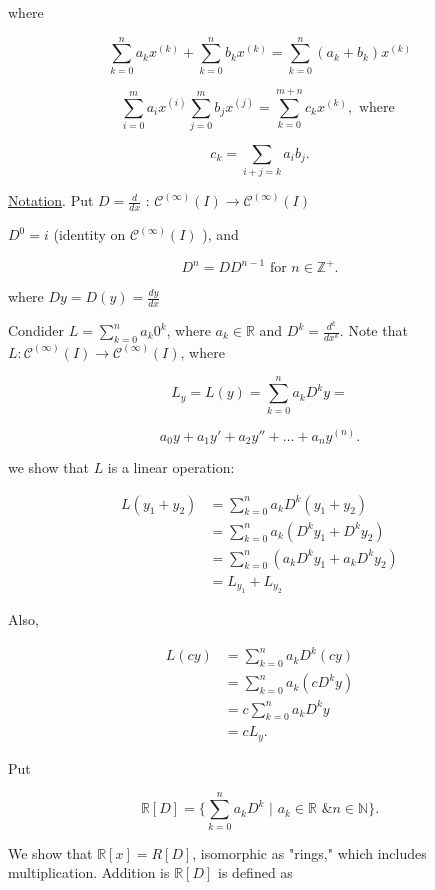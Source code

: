 \documentclass{article}
\theoremstyle{definition}
\begin{document}
where

\[ \sum_{k=0}^n a_kx^{(k)} + \sum_{k=0}^n b_kx^{(k)} = \sum_{k=0}^n
(a_k + b_k)x^{(k)}   \]

\[ \sum_{i=0}^m a_ix^{(i)} \sum_{j=0}^m b_jx^{(j)}  = \sum_{k=0}^{m+n}
c_k x^{(k)}, \text{ where }\]

\[ c_k = \sum_{i+j=k} a_ib_j .\]

\underline{Notation}. Put \( D = \frac{d}{dx} \text{ : }
\mathscr{C}^{(\infty)} (I) \to \mathscr{C}^{(\infty)} (I) \) 

\( D^0 = i \) (identity on \(\mathscr{C}^{(\infty)} (I) \) ), and 

\[ D^n = D D^{n-1} \text{ for } n \in \mathbb{Z}^+ .\]

\hrulefill

where \( Dy = D(y) = \frac{dy}{dx} \)

Condider \( L = \sum_{k=0}^n a_k 0^k \), where \( a_k \in \mathbb{R} \)
and \( D^k = \frac{d^k}{dx^k} \). Note that \( L :
\mathscr{C}^{(\infty)} (I) \to \mathscr{C}^{(\infty)} (I)   \), where  

\[ L_y = L(y) = \sum_{k=0}^n a_k D^k y = \]

\[ a_0y + a_1y' + a_2y'' + \dots + a_ny^{(n)}. \]

we show that \( L \) is a linear operation: 


\begin{align*}
  L(y_1 + y_2) &= \sum_{k=0}^n a_k D^k (y_1 + y_2) \\
  &= \sum_{k=0}^n a_k (D^ky_1 + D^ky_2) \\
  &= \sum_{k=0}^n (a_kD^ky_1 + a_kD^ky_2) \\
  &= L_{y_1} + L_{y_2}
\end{align*}

Also, 

\begin{align*}
  L(cy) &= \sum_{k=0}^n a_k D^k(cy) \\
  &= \sum_{k=0}^n a_k (cD^ky) \\
  &= c\sum_{k=0}^n a_k D^ky \\
  &= cL_y.
\end{align*}

Put 

\[ \mathbb{R} [D] = \{ \sum_{k=0}^n a_k D^k \text{ | } a_k \in
\mathbb{R} \text{ \& } n \in \mathbb{N} \}. \]

We show that \( \mathbb{R}[x] = R[D] \), isomorphic as "rings," which
includes multiplication. Addition is \( \mathbb{R}[D] \) is defined as
\end{document}
